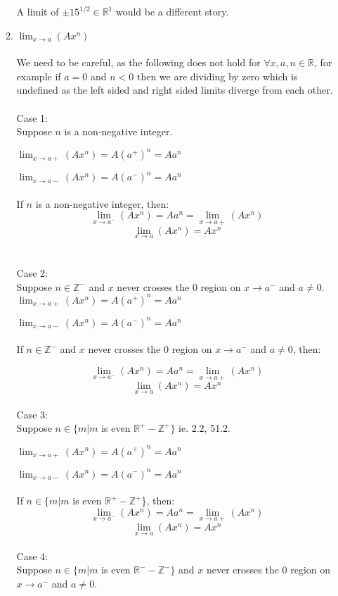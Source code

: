 \documentclass[12pt]{article}
\newcounter{ques}
\newenvironment{question}{\stepcounter{ques}{\noindent\bf Question \arabic{ques}:}}{\vspace{5mm}}
\begin{document}
\begin{question}
\begin{enumerate}[label=(\alph*)]
\begin{enumerate}[label=(\alph*)]
            A limit of $\pm 15^{1/2} \in \mathbb{R}^1$ would be a different story.
      
            \item $\lim_{x \to a}(A x^n)$
            \\\\
            We need to be careful, as the following does not hold for $ \forall x, a, n \in \mathbb{R}$, for example 
            if $a = 0$ and $n < 0$ then we are dividing by zero which is undefined as the left sided and right sided limits diverge from each other.
            \\\\
            Case 1:
            \\
            Suppose $n$ is a non-negative integer.

            $\lim_{x \to a+}(A x^n) = A (a^+)^n = A a^n $

            $\lim_{x \to a-}(A x^n) = A (a^-)^n = A a^n $
            \\\\
            If $n$ is a non-negative integer, then:
            $$\lim_{x \to a^-}(A x^n) = A a^n = \lim_{x \to a+}(A x^n)$$
            $$\lim_{x \to a}(A x^n) = A x^n $$
            \\\\
            Case 2:
            \\
            Suppose $n \in \mathbb{Z^-}$ and $x$ never crosses the 0 region on $x \to a^-$ and $a \neq 0$.
            \\
            $\lim_{x \to a+}(A x^n) = A (a^+)^n = A a^n $

            $\lim_{x \to a-}(A x^n) = A (a^-)^n = A a^n $
            \\\\
            If $n \in \mathbb{Z^-}$ and $x$ never crosses the 0 region on $x \to a^-$ and $a \neq 0$, then:

            $$\lim_{x \to a^-}(A x^n) = A a^n = \lim_{x \to a+}(A x^n)$$
            $$\lim_{x \to a}(A x^n) = A x^n $$
            \\
            Case 3:
            \\
            Suppose $n \in \{m| m$ is even $\mathbb{R^+} - \mathbb{Z^+}\}$ ie. 2.2, 51.2.

            $\lim_{x \to a+}(A x^n) = A (a^+)^n = A a^n $

            $\lim_{x \to a-}(A x^n) = A (a^-)^n = A a^n $
            \\\\
            If $n \in \{m| m$ is even $\mathbb{R^+} - \mathbb{Z^+}$\}, then:
            $$\lim_{x \to a^-}(A x^n) = A a^n = \lim_{x \to a+}(A x^n)$$
            $$\lim_{x \to a}(A x^n) = A x^n $$
            \\
            Case 4:
            \\
            Suppose $n \in \{m| m$ is even $\mathbb{R^-} - \mathbb{Z^-}\}$  and $x$ never crosses the 0 region on $x \to a^-$ and $a \neq 0$.
                       

\end{enumerate}
\end{enumerate}
\end{question}
\end{document}
